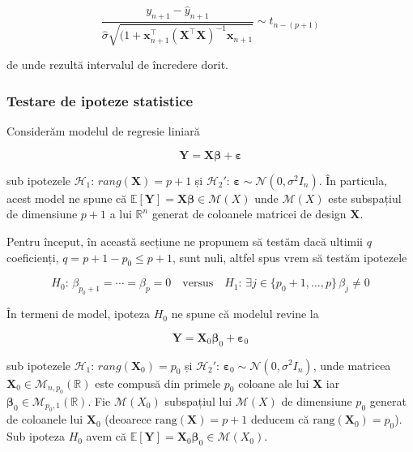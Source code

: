 \documentclass[]{article}
\begin{document}
\[
\frac{y_{n+1} - \hat{y}_{n+1}}{\hat{\sigma}\sqrt{(1 + \boldsymbol x_{n+1}^\intercal(\boldsymbol X^\intercal \boldsymbol X)^{-1}\boldsymbol x_{n+1}}} \sim t_{n-(p+1)}
\]

de unde rezultă intervalul de încredere dorit.

\hypertarget{testare-de-ipoteze-statistice}{%
\subsubsection{Testare de ipoteze
statistice}\label{testare-de-ipoteze-statistice}}

Considerăm modelul de regresie liniară

\[
  \boldsymbol Y = \boldsymbol X\boldsymbol \beta + \boldsymbol \varepsilon
\]

sub ipotezele \(\mathcal{H}_1: \, rang(\boldsymbol X) = p+1\) și
\(\mathcal{H}_2': \, \boldsymbol \varepsilon \sim\mathcal{N}(0, \sigma^2 I_n)\).
În particula, acest model ne spune că
\(\mathbb{E}[\boldsymbol Y] = \boldsymbol X\boldsymbol \beta\in\mathcal{M}(X)\)
unde \(\mathcal{M}(X)\) este subspațiul de dimensiune \(p+1\) a lui
\(\mathbb{R}^n\) generat de coloanele matricei de design
\(\boldsymbol X\).

Pentru început, în această secțiune ne propunem să testăm dacă ultimii
\(q\) coeficienți, \(q = p + 1 - p_0\leq p+1\), sunt nuli, altfel spus
vrem să testăm ipotezele

\[
H_0:\, \beta_{p_0+1} = \cdots = \beta_p = 0 \quad \text{versus}\quad H_1:\,\exists j\in\{p_0+1,\ldots,p\}\, \beta_j\neq 0
\]

În termeni de model, ipoteza \(H_0\) ne spune că modelul revine la

\[
  \boldsymbol Y = \boldsymbol X_0\boldsymbol \beta_0 + \boldsymbol \varepsilon_0
\]

sub ipotezele \(\mathcal{H}_1: \, rang(\boldsymbol X_0) = p_0\) și
\(\mathcal{H}_2': \, \boldsymbol \varepsilon_0 \sim\mathcal{N}(0, \sigma^2 I_n)\),
unde matricea \(\boldsymbol X_0\in\mathcal{M}_{n,p_0}(\mathbb{R})\) este
compusă din primele \(p_0\) coloane ale lui \(\boldsymbol X\) iar
\(\boldsymbol \beta_0\in\mathcal{M}_{p_0,1}(\mathbb{R})\). Fie
\(\mathcal{M}(X_0)\) subspațiul lui \(\mathcal{M}(X)\) de dimensiune
\(p_0\) generat de coloanele lui \(\boldsymbol X_0\) (deoarece
\(\mathrm{rang}(\boldsymbol X) = p+1\) deducem că
\(\mathrm{rang}(\boldsymbol X_0) = p_0\)). Sub ipoteza \(H_0\) avem că
\(\mathbb{E}[\boldsymbol Y] = \boldsymbol X_0\boldsymbol \beta_0\in\mathcal{M}(X_0)\).
\end{document}
